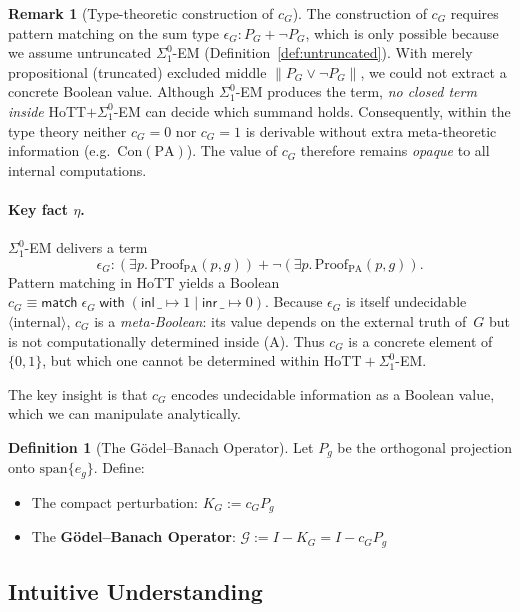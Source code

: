 \documentclass[11pt]{article}
\theoremstyle{definition}
\newtheorem{definition}[theorem]{Definition}
\newtheorem{remark}[theorem]{Remark}
\newcommand{\SigOne}{\Sigma^{0}_{\!1}}
\newcommand{\internal}{\langle\text{internal}\rangle}
\begin{document}
\begin{remark}[Type-theoretic construction of $c_G$]
The construction of $c_G$ requires pattern matching on the sum type 
$\epsilon_G : P_G + \neg P_G$, which is only possible because we assume 
untruncated $\SigOne$-EM (Definition~\ref{def:untruncated}). With 
merely propositional (truncated) excluded middle $\|P_G \lor \neg P_G\|$, we could not extract a concrete Boolean value. Although $\SigOne$-EM produces the term, \emph{no closed term inside}
HoTT$+\SigOne$-EM can decide which summand holds. Consequently, within
the type theory neither $c_G=0$ nor $c_G=1$ is derivable without extra
meta-theoretic information (e.g.\ $\mathrm{Con}(\text{PA})$). The value
of $c_G$ therefore remains \emph{opaque} to all internal computations.
\end{remark}

\paragraph{Key fact $\eta$.}
$\SigOne$-EM delivers a term
\[
  \epsilon_G : (\exists p.\,\mathrm{Proof}_{\mathrm{PA}}(p,g))
               + \neg(\exists p.\,\mathrm{Proof}_{\mathrm{PA}}(p,g)).
\]
Pattern matching in HoTT yields a Boolean
$c_G\equiv \mathsf{match}\;\epsilon_G\;\mathsf{with}\;( \mathsf{inl}\,\_\!\mapsto1
\mid\mathsf{inr}\,\_\!\mapsto0)$.
Because $\epsilon_G$ is itself undecidable $\internal$, $c_G$ is a
\emph{meta-Boolean}: its value depends on the external truth of~$G$ but
is not computationally determined inside (A).
Thus $c_G$ is a concrete element of $\{0,1\}$, but which one cannot be determined within HoTT${}+\SigOne$-EM.

The key insight is that $c_G$ encodes undecidable information as a Boolean value, which we can manipulate analytically.

\begin{definition}[The Gödel--Banach Operator]
Let $P_g$ be the orthogonal projection onto $\mathrm{span}\{e_g\}$. Define:
\begin{itemize}
\item The compact perturbation: $K_G := c_G P_g$
\item The \textbf{Gödel--Banach Operator}: $\mathcal{G} := I - K_G = I - c_G P_g$
\end{itemize}
\end{definition}

\subsection{Intuitive Understanding}
\end{document}
